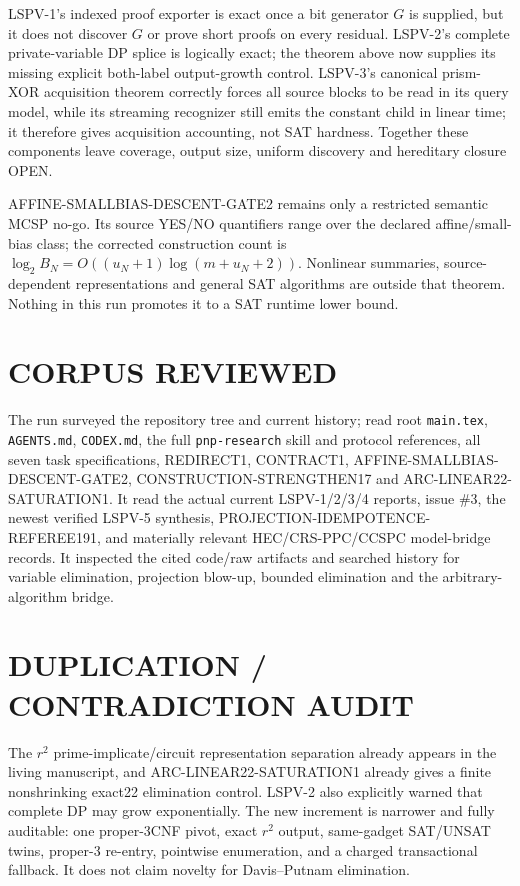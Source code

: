 \documentclass[11pt]{article}
\begin{document}
LSPV-1's indexed proof exporter is exact once a bit generator $G$ is supplied,
but it does not discover $G$ or prove short proofs on every residual.  LSPV-2's
complete private-variable DP splice is logically exact; the theorem above now
supplies its missing explicit both-label output-growth control.  LSPV-3's
canonical prism-XOR acquisition theorem correctly forces all source blocks to
be read in its query model, while its streaming recognizer still emits the
constant child in linear time; it therefore gives acquisition accounting, not
SAT hardness.  Together these components leave coverage, output size,
uniform discovery and hereditary closure OPEN.

AFFINE-SMALLBIAS-DESCENT-GATE2 remains only a restricted semantic MCSP no-go.
Its source YES/NO quantifiers range over the declared affine/small-bias class;
the corrected construction count is
$\log_2 B_N=O((u_N+1)\log(m+u_N+2))$.  Nonlinear summaries, source-dependent
representations and general SAT algorithms are outside that theorem.  Nothing
in this run promotes it to a SAT runtime lower bound.

\section{CORPUS REVIEWED}
The run surveyed the repository tree and current history; read root
\texttt{main.tex}, \texttt{AGENTS.md}, \texttt{CODEX.md}, the full
\texttt{pnp-research} skill and protocol references, all seven task
specifications, REDIRECT1, CONTRACT1, AFFINE-SMALLBIAS-DESCENT-GATE2,
CONSTRUCTION-STRENGTHEN17 and ARC-LINEAR22-SATURATION1.  It read the actual
current LSPV-1/2/3/4 reports, issue \#3, the newest verified LSPV-5 synthesis,
PROJECTION-IDEMPOTENCE-REFEREE191, and materially relevant HEC/CRS-PPC/CCSPC
model-bridge records.  It inspected the cited code/raw artifacts and searched
history for variable elimination, projection blow-up, bounded elimination and
the arbitrary-algorithm bridge.

\section{DUPLICATION / CONTRADICTION AUDIT}
The $r^2$ prime-implicate/circuit representation separation already appears in
the living manuscript, and ARC-LINEAR22-SATURATION1 already gives a finite
nonshrinking exact22 elimination control.  LSPV-2 also explicitly warned that
complete DP may grow exponentially.  The new increment is narrower and fully
auditable: one proper-3CNF pivot, exact $r^2$ output, same-gadget SAT/UNSAT
twins, proper-3 re-entry, pointwise enumeration, and a charged transactional
fallback.  It does not claim novelty for Davis--Putnam elimination.
\end{document}
